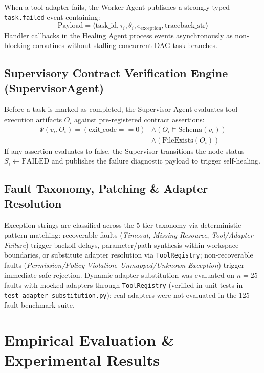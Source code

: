 \documentclass[conference]{IEEEtran}
\begin{document}
When a tool adapter fails, the Worker Agent publishes a strongly typed \texttt{task.failed} event containing:
\begin{equation}
\text{Payload} = \langle \text{task\_id}, \tau_i, \theta_i, e_{\text{exception}}, \text{traceback\_str} \rangle
\end{equation}
Handler callbacks in the Healing Agent process events asynchronously as non-blocking coroutines without stalling concurrent DAG task branches.

\subsection{Supervisory Contract Verification Engine (SupervisorAgent)}
Before a task is marked as completed, the Supervisor Agent evaluates tool execution artifacts $O_i$ against pre-registered contract assertions:
\begin{align}
\Psi(v_i, O_i) = (\text{exit\_code} == 0) &\land (O_i \models \text{Schema}(v_i)) \nonumber \\
&\land (\text{FileExists}(O_i))
\end{align}
If any assertion evaluates to false, the Supervisor transitions the node status $S_i \leftarrow \text{FAILED}$ and publishes the failure diagnostic payload to trigger self-healing.

\subsection{Fault Taxonomy, Patching \& Adapter Resolution}
Exception strings are classified across the 5-tier taxonomy via deterministic pattern matching: recoverable faults (\textit{Timeout}, \textit{Missing Resource}, \textit{Tool/Adapter Failure}) trigger backoff delays, parameter/path synthesis within workspace boundaries, or substitute adapter resolution via \texttt{ToolRegistry}; non-recoverable faults (\textit{Permission/Policy Violation}, \textit{Unmapped/Unknown Exception}) trigger immediate safe rejection. Dynamic adapter substitution was evaluated on $n=25$ faults with mocked adapters through \texttt{ToolRegistry} (verified in unit tests in \texttt{test\_adapter\_substitution.py}); real adapters were not evaluated in the 125-fault benchmark suite.

\section{Empirical Evaluation \& Experimental Results}
\end{document}

